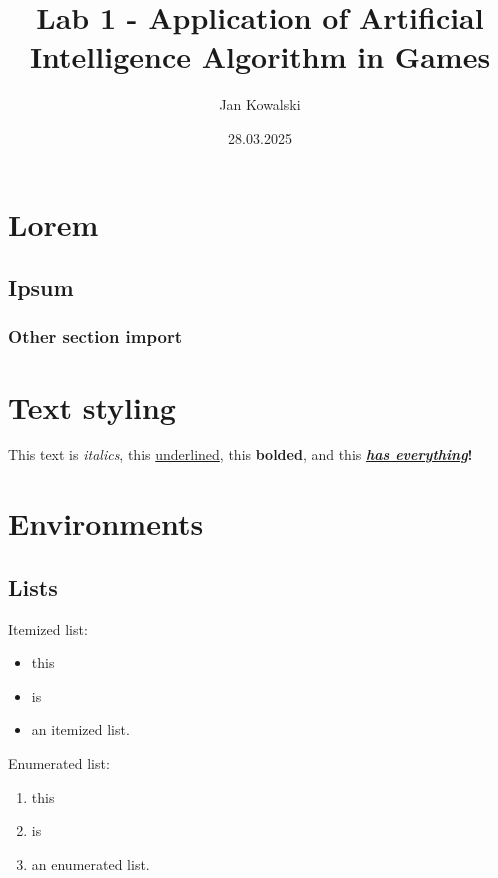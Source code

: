 \documentclass{pwrReport} %
\title{Lab 1 - Application of Artificial Intelligence Algorithm in Games}
\author{Jan Kowalski}
\date{28.03.2025}
\begin{document}
\maketitle  %
\tableofcontents  %
\newpage



\section{Lorem}
    \subsection{Ipsum}
        \subsubsection{Other section import}
            

\section{Text styling}
    This text is \textit{italics}, this \underline{underlined}, this \textbf{bolded}, and this
    \textbf{\textit{\underline{has everything}}!}


\section{Environments}
    \subsection{Lists}
        Itemized list:
        \begin{itemize}
            \item this
            \item is
            \item an itemized list.
        \end{itemize}

        Enumerated list:
        \begin{enumerate}
            \item this
            \item is
            \item an enumerated list.
        \end{enumerate}
\end{document}
